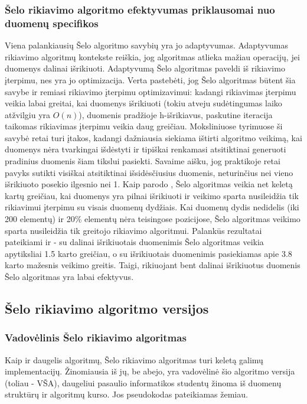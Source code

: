 \documentclass{VUMIFInfKursinis}
\begin{document}
\subsubsection{Šelo rikiavimo algoritmo efektyvumas priklausomai nuo duomenų specifikos}

Viena palankiausių Šelo algoritmo savybių yra jo adaptyvumas.
Adaptyvumas rikiavimo algoritmų kontekste reiškia, jog algoritmas atlieka mažiau operacijų, jei duomenys dalinai išrikiuoti.
Adaptyvumą Šelo algoritmas paveldi iš rikiavimo įterpimu, nes yra jo optimizacija.
Verta pastebėti, jog Šelo algoritmas būtent šia savybe ir remiasi rikiavimo įterpimu optimizavimui:
kadangi rikiavimas įterpimu veikia labai greitai, kai duomenys išrikiuoti (tokiu atveju sudėtingumas laiko atžvilgiu yra $O(n)$),
duomenis pradžioje h-išrikiavus, paskutine iteracija taikomas rikiavimas įterpimu veikia daug greičiau.
Moksliniuose tyrimuose ši savybė retai turi įtakos, kadangi dažniausia siekiama ištirti algoritmo veikimą, kai duomenys
nėra tvarkingai išdėstyti ir tipiškai renkamasi atsitiktinai generuoti pradinius duomenis šiam tikslui pasiekti.
Savaime aišku, jog praktikoje retai pavyks sutikti visiškai atsitiktinai išsidėsčiusius duomenis, neturinčius nei vieno išrikiuoto posekio ilgesnio nei 1.
Kaip parodo \cite{10.1145/359024.359026}, Šelo algoritmas veikia net keletą kartų greičiau, kai duomenys yra pilnai
išrikiuoti ir veikimo sparta nusileidžia tik rikiavimui įterpimu su visais duomenų dydžiais.
Kai duomenų dydis nedidelis (iki 200 elementų) ir 20\% elementų nėra teisingose pozicijose, Šelo algoritmas veikimo sparta nusileidžia tik greitojo rikiavimo algoritmui.
Palankūs rezultatai pateikiami ir \cite{7280062} - su dalinai išrikiuotais duomenimis Šelo algoritmas veikia apytiksliai 1.5 karto greičiau, o su išrikiuotais
duomenimis pasiekiamas apie 3.8 karto mažesnis veikimo greitis.
Taigi, rikiuojant bent dalinai išrikiuotus duomenis Šelo algoritmas yra labai efektyvus.

\subsection{Šelo rikiavimo algoritmo versijos}

\subsubsection{Vadovėlinis Šelo rikiavimo algoritmas}

Kaip ir daugelis algoritmų, Šelo rikiavimo algoritmas turi keletą galimų implementacijų.
Žinomiausia iš jų, be abejo, yra vadovėlinė šio algoritmo versija (toliau - VŠA),
daugeliui pasaulio informatikos studentų žinoma iš duomenų struktūrų ir algoritmų kurso.
Jos pseudokodas pateikiamas žemiau.
\end{document}
